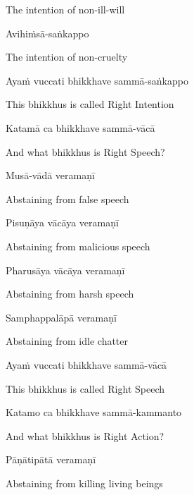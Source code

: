 \begin{english}
  The intention of non-ill-will
\end{english}

Avihiṁsā-saṅkappo

\begin{english}
  The intention of non-cruelty
\end{english}

Ayaṁ vuccati bhikkhave sammā-saṅkappo

\begin{english}
  This bhikkhus is called Right Intention
\end{english}

Katamā ca bhikkhave sammā-vācā

\begin{english}
  And what bhikkhus is Right Speech?
\end{english}

Musā-vādā veramaṇī

\begin{english}
  Abstaining from false speech
\end{english}

Pisuṇāya vācāya veramaṇī

\begin{english}
  Abstaining from malicious speech
\end{english}

Pharusāya vācāya veramaṇī

\begin{english}
  Abstaining from harsh speech
\end{english}

Samphappalāpā veramaṇī

\begin{english}
  Abstaining from idle chatter
\end{english}

Ayaṁ vuccati bhikkhave sammā-vācā

\begin{english}
  This bhikkhus is called Right Speech
\end{english}

Katamo ca bhikkhave sammā-kammanto

\begin{english}
  And what bhikkhus is Right Action?
\end{english}

Pāṇātipātā veramaṇī

\begin{english}
  Abstaining from killing living beings
\end{english}

